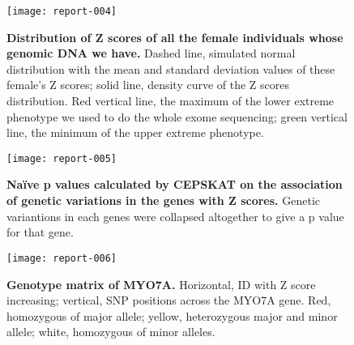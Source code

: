 \documentclass{article}
\begin{document}
\begin{figure}[htb]
\centering
\texttt{[image: report-004]}

\caption{{\bf {Distribution of Z scores of all the female individuals whose genomic DNA we have.}} Dashed line, simulated normal distribution with the mean and standard deviation values of these female's Z scores; solid line, density curve of the Z scores distribution. Red vertical line, the maximum of the lower extreme phenotype we used to do the whole exome sequencing; green vertical line, the minimum of the upper extreme phenotype. }
\label{fig:zdistr}
\end{figure}


\begin{figure}[htb]
\centering
\texttt{[image: report-005]}

\caption{{\bf {Na\"ive p values calculated by CEPSKAT on the association of genetic variations in the genes with Z scores.}} Genetic variantions in each genes were collapsed altogether to give a p value for that gene. }
\label{fig:allP}
\end{figure}

\begin{figure}[htb]
\centering
\texttt{[image: report-006]}

\caption{{\bf {Genotype matrix of MYO7A.}} Horizontal, ID with Z score increasing; vertical, SNP positions across the MYO7A gene. Red, homozygous of major allele; yellow, heterozygous major and minor allele; white, homozygous of minor alleles.}
\label{fig:myo7a}
\end{figure}
\end{document}

